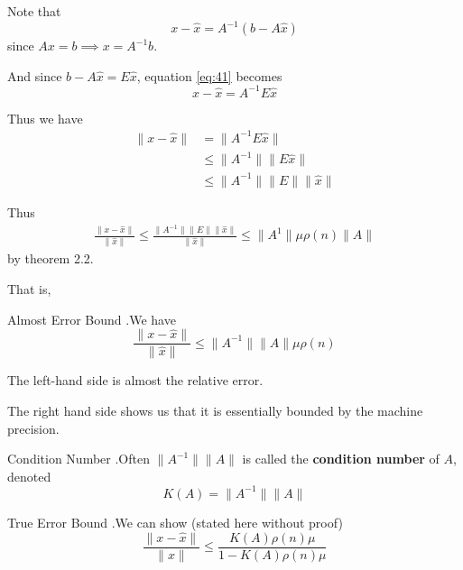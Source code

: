 \documentclass[12pt,letterpaper]{article}
\begin{document}
Note that
\begin{equation} \label{eq:41}
	x - \hat{x} = A^{-1}(b - A\hat{x})
\end{equation}
since $Ax = b \implies x = A^{-1} b$.

And since $b - A\hat{x} = E\hat{x}$, equation \ref{eq:41} becomes
\begin{equation}
	x - \hat{x} = A^{-1} E \hat{x}
\end{equation}

Thus we have
\begin{align}
	\lVert x - \hat{x} \rVert &= \lVert A^{-1} E \hat{x} \rVert \\
	&\leq \lVert A^{-1} \rVert \lVert E \hat{x} \rVert \\
	&\leq \lVert A^{-1} \rVert \lVert E \rVert \lVert \hat{x} \rVert
\end{align}

Thus
\begin{align}
	\frac{\lVert x - \hat{x} \rVert}{\lVert \hat{x} \rVert} \leq \frac{\lVert A^{-1} \rVert \lVert E \rVert \lVert \hat{x} \rVert}{\lVert \hat{x} \rVert}
	\leq \lVert A^{1} \rVert \mu \rho(n) \lVert A \rVert
\end{align}
by theorem 2.2.

That is,
\begin{theo}{Almost Error Bound}
.We have
\begin{equation}
	\frac{\lVert x - \hat{x} \rVert}{\lVert \hat{x} \rVert} \leq \lVert A^{-1} \rVert \lVert A \rVert \mu \rho(n)
\end{equation}

The left-hand side is almost the relative error.

The right hand side shows us that it is essentially bounded by the machine precision.
\label{thm:almost_bound}
\end{theo}

\begin{defn}{Condition Number}
.Often $\lVert A^{-1} \rVert \lVert A \rVert$ is called the \textbf{condition number} of $A$, denoted
\begin{equation}
	K(A) = \lVert A^{-1} \rVert \lVert A \rVert
\end{equation}
\label{def:condition_number}
\end{defn}

\begin{theo}{True Error Bound}
.We can show (stated here without proof)
\begin{equation}
	\frac{\lVert x - \hat{x} \rVert}{\lVert x \rVert} \leq \frac{ K(A) \rho(n) \mu}{1 - K(A) \rho(n) \mu}
\end{equation}
\label{thm:true_bound}
\end{theo}
\end{document}
